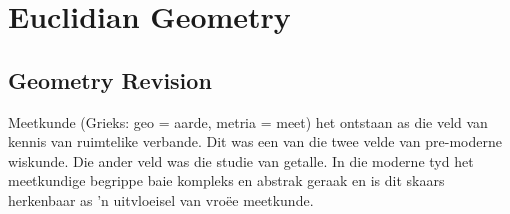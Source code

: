 \chapter{Euclidian Geometry}
\setcounter{figure}{1}
\setcounter{subfigure}{1}
\section{Geometry Revision}
\setcounter{figure}{1}
\setcounter{subfigure}{1}

Meetkunde (Grieks: geo = aarde, metria = meet) het ontstaan as die veld van kennis van ruimtelike verbande.
Dit was een van die twee velde van pre-moderne wiskunde. Die ander veld was die studie van getalle. In
die moderne tyd het meetkundige begrippe baie kompleks en abstrak geraak en is dit skaars herkenbaar as ’n
uitvloeisel van vroëe meetkunde.\par 

